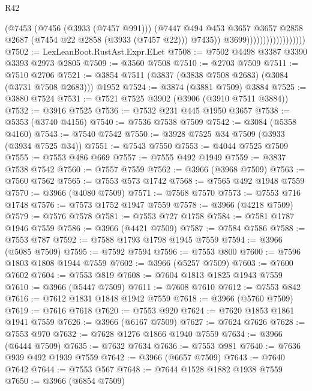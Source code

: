 \begin{lexlean}{R42}
\begin{coremodule}
                                        (@7453
                                          (@7456 (@3933 (@7457 @991)))
                                          (@7447
                                            @494
                                            @453
                                            @3657
                                            @3657
                                            @2858
                                            @2687
                                            (@7454 @22 @2858 (@3933 (@7457 @22)))
                                            @7435))
                                        @3699))))))))))))))))))
@7502 := LexLeanBoot.RustAst.Expr.ELet
@7508 := @7502 @4498 @3387 @3390 @3393 @2973 @2805
@7509 := @3560 @7508
@7510 := @2703 @7509
@7511 := @7510 @2706
@7521 := @3854 @7511 (@3837 (@3838 @7508 @2683) (@3084 (@3731 @7508 @2683))) @1952
@7524 := @3874 (@3881 @7509) @3884
@7525 := @3880 @7524
@7531 := @7521 @7525 @3902 (@3906 (@3910 @7511 @3884))
@7532 := @3916 @7525
@7536 := @7532 @231 @445 @1950 @3657
@7538 := @5353 (@3740 @4156)
@7540 := @7536 @7538 @7509
@7542 := @3084 (@5358 @4160)
@7543 := @7540 @7542
@7550 := @3928 @7525 @34 @7509 (@3933 (@3934 @7525 @34))
@7551 := @7543 @7550
@7553 := @4044 @7525 @7509
@7555 := @7553 @486 @669
@7557 := @7555 @492 @1949
@7559 := @3837 @7538 @7542
@7560 := @7557 @7559
@7562 := @3966 (@3968 @7509)
@7563 := @7560 @7562
@7565 := @7553 @573 @1742
@7568 := @7565 @492 @1948 @7559
@7570 := @3966 (@4080 @7509)
@7571 := @7568 @7570
@7573 := @7553 @716 @1748
@7576 := @7573 @1752 @1947 @7559
@7578 := @3966 (@4218 @7509)
@7579 := @7576 @7578
@7581 := @7553 @727 @1758
@7584 := @7581 @1787 @1946 @7559
@7586 := @3966 (@4421 @7509)
@7587 := @7584 @7586
@7588 := @7553 @787
@7592 := @7588 @1793 @1798 @1945 @7559
@7594 := @3966 (@5085 @7509)
@7595 := @7592 @7594
@7596 := @7553 @800
@7600 := @7596 @1803 @1808 @1944 @7559
@7602 := @3966 (@5257 @7509)
@7603 := @7600 @7602
@7604 := @7553 @819
@7608 := @7604 @1813 @1825 @1943 @7559
@7610 := @3966 (@5447 @7509)
@7611 := @7608 @7610
@7612 := @7553 @842
@7616 := @7612 @1831 @1848 @1942 @7559
@7618 := @3966 (@5760 @7509)
@7619 := @7616 @7618
@7620 := @7553 @920
@7624 := @7620 @1853 @1861 @1941 @7559
@7626 := @3966 (@6167 @7509)
@7627 := @7624 @7626
@7628 := @7553 @970
@7632 := @7628 @1276 @1866 @1940 @7559
@7634 := @3966 (@6444 @7509)
@7635 := @7632 @7634
@7636 := @7553 @981
@7640 := @7636 @939 @492 @1939 @7559
@7642 := @3966 (@6657 @7509)
@7643 := @7640 @7642
@7644 := @7553 @567
@7648 := @7644 @1528 @1882 @1938 @7559
@7650 := @3966 (@6854 @7509)

\end{coremodule}
\end{lexlean}
